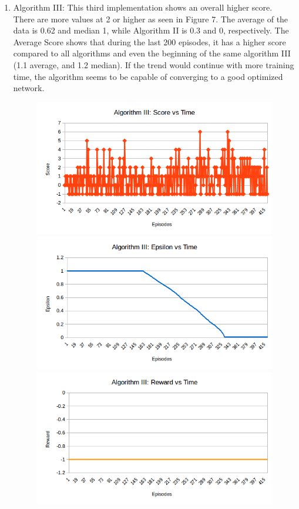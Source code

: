 \documentclass{article}
\begin{document}
\begin{enumerate}
    \item Algorithm III: This third implementation shows an overall higher score. There are more values at 2 or higher as seen in Figure 7. The average of the data is 0.62 and median 1, while Algorithm II is 0.3 and 0, respectively. The Average Score shows that during the last 200 episodes, it has a higher score compared to all algorithms and even the beginning of the same algorithm III (1.1 average, and 1.2 median). If the trend would continue with more training time, the algorithm seems to be capable of converging to a good optimized network.  
    
    
    \begin{figure}[H]
        \centering
        \includegraphics[width=.8\textwidth]{Algorithm3_score.png}\hfill
        \includegraphics[width=.8\textwidth]{Algorithm3_epsilon.png}\hfill 
        \includegraphics[width=.8\textwidth]{Algorithm3_reward.png}\hfill 

\end{figure}
\end{enumerate}
\end{document}
